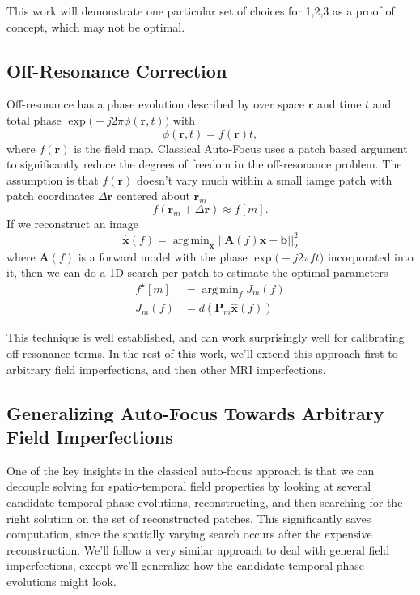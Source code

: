 \documentclass{article}
\DeclareMathOperator*{\argmin}{arg\,min}
\newcommand{\x}{\mathbf{x}}
\renewcommand{\r}{\mathbf{r}}
\newcommand{\A}{\mathbf{A}}
\renewcommand{\P}{\mathbf{P}}
\renewcommand{\b}{\mathbf{b}}
\begin{document}
This work will demonstrate one particular set of choices for 1,2,3 as a proof of concept, which may not be optimal. 

\subsection{Off-Resonance Correction}
Off-resonance has a phase evolution described by over space $\r$ and time $t$ and total phase $\exp\big( -j2\pi \phi(\r,t) \big)$ with
\begin{equation}
    \phi(\r, t) = f(\r) t,
\end{equation}
where $f(\r)$ is the field map. Classical Auto-Focus uses a patch based argument to significantly reduce the degrees of freedom in the off-resonance problem. The assumption is that $f(\r)$ doesn't vary much within a small iamge patch with patch coordinates $\Delta \r$ centered about $\r_m$
\begin{equation}
    f(\r_m + \Delta \r) \approx f[m].
\end{equation}
If we reconstruct an image 
\begin{equation}
    \hat{\x}(f) = \argmin_{\x}||\A(f) \x - \b ||_2^2
\end{equation}
where $\A(f)$ is a forward model with the phase $\exp\big( -j2\pi f t \big)$ incorporated into it, then we can do a 1D search per patch to estimate the optimal parameters
\begin{align}
    f^\star[m] &= \argmin_f J_m(f) \\
    J_m(f) &= d(\P_m \hat{\x}(f))
\end{align}

This technique is well established, and can work surprisingly well for calibrating off resonance terms. In the rest of this work, we'll extend this approach first to arbitrary field imperfections, and then other MRI imperfections.

\subsection{Generalizing Auto-Focus Towards Arbitrary Field Imperfections}
One of the key insights in the classical auto-focus approach is that we can decouple solving for spatio-temporal field properties by looking at several candidate temporal phase evolutions, reconstructing, and then searching for the right solution on the set of reconstructed patches. This significantly saves computation, since the spatially varying search occurs after the expensive reconstruction. We'll follow a very similar approach to deal with general field imperfections, except we'll generalize how the candidate temporal phase evolutions might look.
\end{document}
